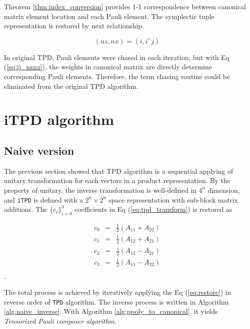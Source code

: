 \documentclass[twocolumn]{article}
\begin{document}
Theorem \ref{thm:index_conversion} provides 1-1 correspondence 
between canonical matrix element location and each Pauli element.
The symplectic tuple representation is restored by next relationship.

\begin{equation}
    (nz, nx) = (i, i^\wedge j)
\end{equation}

In original TPD, Pauli elements were chased in each iteration, 
but with Eq (\ref{eq:ij_nznx}), the weights in canonical matrix 
are directly determine corresponding Pauli elements.
Therefore, the term chasing routine could be eliminated from the original TPD algorithm.

\section{iTPD algorithm}

\subsection{Naive version}

The previous section showed that TPD algorithm is a sequential 
applying of unitary transformation for each vectors in a product representation.
By the property of unitary, the inverse transformation is well-defined 
in $4^n$ dimension, and \texttt{iTPD} is defined with a $2^n \times 2^n$ space representation with 
sub-block matrix additions. 
The $\{c_i\}_{i=0}^3$ coefficients in Eq (\ref{eq:tpd_transform}) is restored as 

\begin{equation}
    \label{eq:restore}
    \begin{array}{ccc}
        c_0 &=& \frac{1}{2} (A_{11} + A_{22})\\
        c_1 &=& \frac{1}{2} (A_{12} + A_{21})\\
        c_2 &=& \frac{i}{2} (A_{12} - A_{21})\\
        c_3 &=& \frac{1}{2} (A_{11} - A_{22})\\
    \end{array}
\end{equation}.

The total process is achieved by iteratively applying the Eq (\ref{eq:restore}) in reverse order of \texttt{TPD} algorithm. 
The inverse process is written in Algorithm \ref{alg:naive_inverse}.
With Algorithm \ref{alg:ppoly_to_canonical}, it yields \textit{Tensorized Pauli composer algorithm}.
\end{document}
